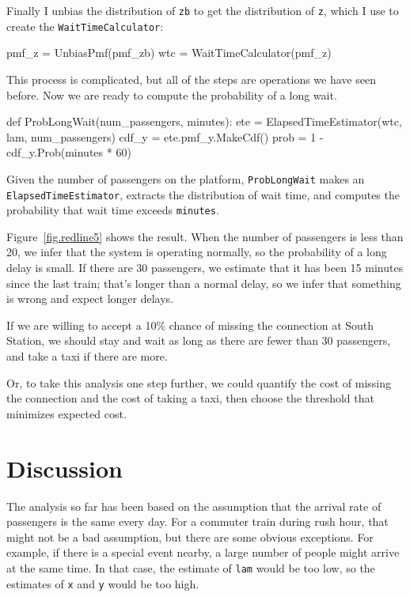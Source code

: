 \documentclass[12pt]{book}
\theoremstyle{exercise}
\newcommand{\py}[1]{{\tt #1}}%
\begin{document}
Finally I unbias the distribution of \py{zb} to get the
distribution of \py{z}, which I use to create the
\py{WaitTimeCalculator}:

\begin{code}
    pmf_z = UnbiasPmf(pmf_zb)
    wtc = WaitTimeCalculator(pmf_z)
\end{code}

This process is complicated, but
all of the steps are operations we have seen before.
Now we are ready to compute the probability of a long wait.

\begin{code}
def ProbLongWait(num_passengers, minutes):
    ete = ElapsedTimeEstimator(wtc, lam, num_passengers)
    cdf_y = ete.pmf_y.MakeCdf()
    prob = 1 - cdf_y.Prob(minutes * 60)
\end{code}

Given the number of passengers on the platform,
\py{ProbLongWait}
makes an \py{ElapsedTimeEstimator},
extracts the distribution of wait time, and
computes
the probability that wait time
exceeds \py{minutes}.

Figure~\ref{fig.redline5} shows the result.  When the number of
passengers is less than 20, we infer that the system is
operating normally, so the probability of a long delay is small.
If there are 30 passengers, we estimate that it has been 15
minutes since the last train; that's longer than a normal delay,
so we infer that something is wrong and expect longer delays.

If we are willing to accept a 10\% chance of missing the connection
at South Station, we should stay and wait as long as there
are fewer than 30 passengers, and take a taxi if there are more.

Or, to take this analysis one step further, we could quantify the cost
of missing the connection and the cost of taking a taxi, then choose
the threshold that minimizes expected cost.

\section{Discussion}

The analysis so far has been based on the assumption that the
arrival rate of passengers is the same every day.  For a commuter
train during rush hour, that might not be a bad assumption, but
there are some obvious exceptions.  For example, if there is a special
event nearby, a large number of people might arrive at the same time.
In that case, the estimate of \py{lam} would be too low, so the
estimates of \py{x} and \py{y} would be too high.
\end{document}
